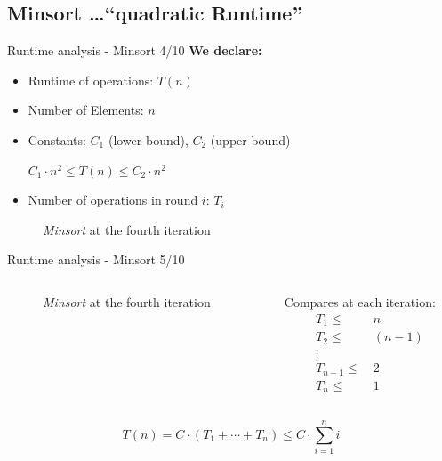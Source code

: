 \documentclass{beamer}
\begin{document}

\subsection{Minsort \ldots{}``quadratic Runtime''}


\begin{frame}{Runtime analysis - Minsort 4/10}
  \textbf{We declare:}
  \begin{itemize}
    \item Runtime of operations: $T(n)$
    \item Number of Elements: $n$
    \item Constants: $C_1$ ({\color{Hell-Gruen}lower bound}),
      $C_2$ ({\color{Hell-Gruen}upper bound})
    \begin{center}
      $C_{1} \cdot n^2
      \leq T(n)
      \leq C_{2} \cdot n^2$
    \end{center}
    \item Number of operations in round $i$: $T_i$
  \end{itemize}
  \begin{figure}[!h]
    \begin{adjustbox}{width=0.5\linewidth}
    \end{adjustbox}%
    \caption{\textit{Minsort} at the fourth iteration}%
    \label{fig:minsort_def}%
  \end{figure}
\end{frame}

\begin{frame}{Runtime analysis - Minsort 5/10}
  \begin{columns}
    \begin{column}{0.55\textwidth}
      \begin{figure}[!h]%
        \begin{adjustbox}{width=\linewidth}%
        \end{adjustbox}%
        \caption{\textit{Minsort} at the fourth iteration}%
        \label{fig:minsort_brace}%
      \end{figure}
    \end{column}
    \begin{column}{0.40\textwidth}
      Compares at each iteration:
      \begin{align*}
        T_1  \leq &~ n\\
        T_2  \leq &~ (n-1)\\
        {}  \vdots~ &~ {} \\
        T_{n-1}  \leq &~ 2\\
        T_n  \leq &~ 1
      \end{align*}
    \end{column}
  \end{columns}
  \[
    T(n)
      = C \cdot \left(T_1 + \cdots + T_n\right)
      \leq C \cdot \sum \limits^n_{i=1} i
  \]
\end{frame}
\end{document}

